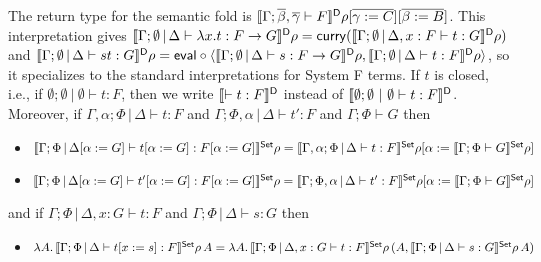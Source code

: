 \documentclass[runningheads]{llncs}
\begin{document}
The return type for the semantic fold is
  $\llbracket{\Gamma;\overline{\beta},\overline{\gamma} \vdash F}\rrbracket^{\mathsf D}\rho[\overline{\gamma :=
    C}][\overline{\beta := B}]$.
  This interpretation gives $\llbracket{\Gamma;\emptyset \,|\, \Delta
    \vdash \lambda x.t : F \to G}\rrbracket^{\mathsf D}\rho = \mathsf{curry}
  (\llbracket{\Gamma;\emptyset \,|\, \Delta, x : F \vdash t :
    G}\rrbracket^{\mathsf D}\rho)$ and $\llbracket{\Gamma;\emptyset \,|\, \Delta \vdash st:
    G}\rrbracket^{\mathsf D} \rho = \mathsf{eval} \circ \langle \llbracket{\Gamma;\emptyset \,|\,
    \Delta \vdash s: F \to G}\rrbracket^{\mathsf D}\rho, \llbracket{\Gamma;\emptyset
    \,|\, \Delta \vdash t: F}\rrbracket^{\mathsf D}\rho \rangle$, so it specializes to
  the standard interpretations for System F terms.  If $t$ is closed,
  i.e., if $\emptyset; \emptyset~|~\emptyset \vdash t : F$, then we
  write $\llbracket{\vdash t : F}\rrbracket^{\mathsf D}$ instead of $\llbracket{\emptyset;
    \emptyset~|~\emptyset \vdash t : F}\rrbracket^{\mathsf D}$.
Moreover, if
  $\Gamma,\alpha;\Phi \,|\, \Delta \vdash t : F$ and
  $\Gamma;\Phi,\alpha \,|\, \Delta \vdash t' : F$ and $\Gamma;\Phi
  \vdash G$ then
\begin{itemize}
\item $\llbracket{\Gamma;\Phi \,|\, \Delta[\alpha := G] \vdash
  t[\alpha := G] : F[\alpha := G]}\rrbracket^{\mathsf{Set}}\rho =
  \llbracket{\Gamma,\alpha;\Phi \,|\, \Delta \vdash t : F }\rrbracket^{\mathsf{Set}}\rho [
    \alpha := \llbracket{\Gamma;\Phi\vdash G}\rrbracket^{\mathsf{Set}}\rho ]$
\item $\llbracket{\Gamma;\Phi \,|\, \Delta[\alpha := G] \vdash
  t'[\alpha := G] : F[\alpha := G]}\rrbracket^{\mathsf{Set}}\rho =
  \llbracket{\Gamma;\Phi,\alpha \,|\, \Delta \vdash t' : F }\rrbracket^{\mathsf{Set}}\rho [
    \alpha := \llbracket{\Gamma;\Phi\vdash G}\rrbracket^{\mathsf{Set}}\rho ]$
\end{itemize}
and if $\Gamma;\Phi \,|\, \Delta, x: G \vdash t : F$ and
$\Gamma;\Phi \,|\, \Delta \vdash s : G$ then
\begin{itemize}
\item $\lambda A.\, \llbracket{\Gamma;\Phi \,|\, \Delta \vdash t[x := s]
  : F }\rrbracket^{\mathsf{Set}}\rho \, A = \lambda A.\,\llbracket{\Gamma;\Phi \,|\, \Delta, x:
  G \vdash t : F}\rrbracket^{\mathsf{Set}}\rho \,(A, \llbracket{\Gamma;\Phi \,|\,
  \Delta\vdash s: G}\rrbracket^{\mathsf{Set}}\rho\, A)$
\end{itemize}
\end{document}
